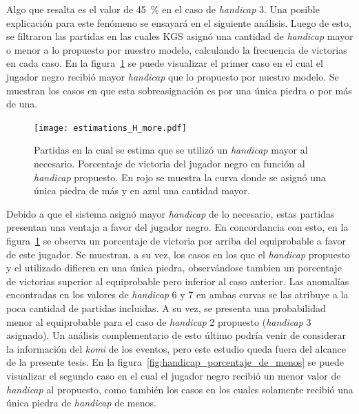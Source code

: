 \documentclass[11pt,twoside,spanish]{report} %
\begin{document}
Algo que resalta es el valor de \SI{45}{\percent} en el caso de \textit{handicap} 3.
Una posible explicaci\'on para este fen\'omeno se ensayar\'a  en el siguiente an\'alisis.
Luego de esto, se filtraron las partidas en las cuales KGS asign\'o una cantidad de \textit{handicap} mayor o menor a lo propuesto por nuestro modelo, calculando la frecuencia de victorias en cada caso.
En la figura~\ref{fig:handicap_porcentaje_de_mas} se puede visualizar el primer caso en el cual el jugador negro recibi\'o mayor \textit{handicap} que lo propuesto por nuestro modelo. 
Se muestran los casos en que esta sobreasignaci\'on es por una \'unica piedra o por m\'as de una.


\begin{figure}[H]
    \centering
    \texttt{[image: estimations\_H\_more.pdf]}
    \caption{Partidas en la cual se estima que se utiliz\'o un \textit{handicap} mayor al necesario. Porcentaje de victoria del jugador negro en funci\'on al \textit{handicap} propuesto. En rojo se muestra la curva donde se asign\'o  una \'unica piedra de m\'as y en azul una cantidad mayor. }
    \label{fig:handicap_porcentaje_de_mas}
\end{figure}


Debido a que el sistema asign\'o mayor \textit{handicap} de lo necesario,  estas partidas presentan una ventaja a favor del jugador negro.
En concordancia con esto, en la figura~\ref{fig:handicap_porcentaje_de_mas} se observa un porcentaje de victoria por arriba del equiprobable a favor de este jugador.
Se muestran, a su vez, los casos en los que el \textit{handicap} propuesto y el utilizado difieren en una \'unica piedra, observ\'andose tambien un porcentaje de victorias superior al equiprobable pero inferior al caso anterior.
Las anomal\'ias encontradas en los valores de \textit{handicap} 6 y 7 en ambas curvas se las atribuye a la poca cantidad de partidas incluidas.
A su vez, se presenta una probabilidad menor al equiprobable para el caso de \textit{handicap} 2 propuesto (\textit{handicap} 3 asignado).
Un an\'alisis complementario de esto \'ultimo podr\'ia venir de considerar la informaci\'on del \textit{komi} de los eventos, pero este estudio queda fuera del alcance de la presente tesis.
En la figura~\ref{fig:handicap_porcentaje_de_menos} se puede visualizar el segundo caso en el cual el jugador negro recibi\'o un menor valor de \textit{handicap} al propuesto, como tambi\'en los casos en los cuales solamente recibi\'o una \'unica piedra de \textit{handicap} de menos.
\end{document}
